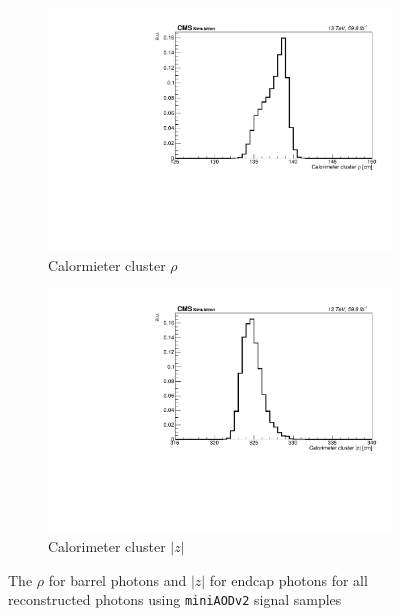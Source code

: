 \begin{figure}[htb!]
	\centering
	\captionsetup[subfigure]{justification=centering}
	\begin{subfigure}[h]{0.45\linewidth}
		\centering
		\includegraphics[width=\linewidth]{figs/05_analysis/calorimeter_rho.pdf}
		\caption{Calormieter cluster $\rho$}
	\end{subfigure}
	\begin{subfigure}[h]{0.45\linewidth}
		\centering
		\includegraphics[width=\linewidth]{figs/05_analysis/calorimeter_z.pdf}
		\caption{Calorimeter cluster $|z|$}
	\end{subfigure}
	\caption{The $\rho$ for barrel photons and $|z|$ for endcap photons for all reconstructed photons using \texttt{miniAODv2} signal samples}
	\label{fig:calo_position}
\end{figure}

